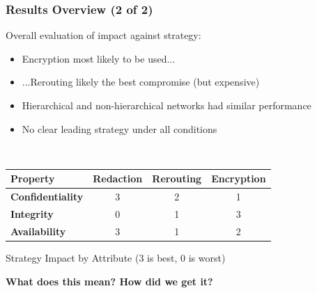 \documentclass[t,handout]{beamer}
\begin{document}
\begin{frame}
\frametitle{Results Overview (2 of 2)}
Overall evaluation of impact against strategy:
\begin{itemize}
\item {\small Encryption most likely to be used...}
\item {\small ...Rerouting likely the best compromise (but expensive)}
\item {\small Hierarchical and non-hierarchical networks had similar performance}
\item {\small No clear leading strategy under all conditions}
\end{itemize}
~\\
\centering %
\begin{tabular}{lccc}
\toprule %
{\bf Property}			& {\bf Redaction}	& {\bf Rerouting} 	& {\bf Encryption} 	\\\toprule
{\bf Confidentiality} 	& 3				  	& 2					& 1				 	\\\midrule
{\bf Integrity}			& 0					& 1					& 3 					\\\midrule
{\bf Availability}		& 3					& 1					& 2					\\\bottomrule
\end{tabular}
\label{table:model:evaluation}
\begin{center}
{\scriptsize Strategy Impact by Attribute (3 is best, 0 is worst)}
\end{center}
\begin{center}
{\bf What does this mean? How did we get it?}
\end{center}
\end{frame}
\end{document}
